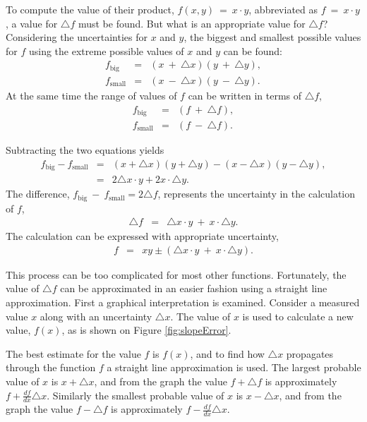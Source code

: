 \documentclass[12pt]{article}
\begin{document}
To compute the value of their product, $f(x,y)~=~x\cdot y$,
abbreviated as $f~=~x\cdot y$, a value for $\triangle{f}$ must be
found.  But what is an appropriate value for $\triangle{f}$?
Considering the uncertainties for $x$ and $y$, the biggest and
smallest possible values for $f$ using the extreme possible values of
$x$ and $y$ can be found:
\begin{eqnarray}
f_\mathrm{big} &=& (x~+~\triangle{x})(y~+~\triangle{y}), \\
f_\mathrm{small} &=& (x~-~\triangle{x})(y~-~\triangle{y}).
\end{eqnarray}
At the same time the range of values of $f$ can be written in terms of
$\triangle f$,
\begin{eqnarray}
f_\mathrm{big} &=& (f~+~\triangle{f}), \\
f_\mathrm{small} &=& (f~-~\triangle{f}).
\end{eqnarray}

Subtracting the two equations yields
\begin{eqnarray}
f_\mathrm{big} - f_\mathrm{small} &=& 
(x + \triangle{x})(y + \triangle{y}) - 
(x - \triangle{x})(y - \triangle{y}), \\
&=& 2 \triangle{x} \cdot y + 2 x \cdot \triangle{y}.
\end{eqnarray}
The difference, $f_\mathrm{big}~-~f_\mathrm{small} = 2\triangle{f}$,
represents the uncertainty in the calculation of $f$, 
\begin{eqnarray}
\triangle{f} &=& \triangle{x} \cdot y~+~x \cdot \triangle{y}.
\end{eqnarray}
The calculation can be expressed with appropriate uncertainty,
\begin{eqnarray}
f &=& xy \pm (\triangle{x} \cdot y~+~x \cdot \triangle{y}).
\end{eqnarray}


This process can be too complicated for most other functions.
Fortunately, the value of $\triangle{f}$ can be approximated in an
easier fashion using a straight line approximation.  First a graphical
interpretation is examined.  Consider a measured value $x$ along with
an uncertainty $\triangle{x}$.  The value of $x$ is used to calculate
a new value, $f(x)$, as is shown on Figure \ref {fig:slopeError}.  

The best estimate for the value $f$ is $f(x)$, and to find how
$\triangle{x}$ propagates through the function $f$ a straight line
approximation is used.  The largest probable value of $x$ is
$x+\triangle{x}$, and from the graph the value $f+\triangle{f}$ is
approximately $f+\frac{df}{dx}\triangle x$.  Similarly the smallest
probable value of $x$ is $x-\triangle{x}$, and from the graph the
value $f-\triangle{f}$ is approximately $f-\frac{df}{dx}\triangle x$.
 
\end{document}

